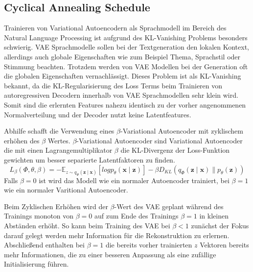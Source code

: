 \subsection{Cyclical Annealing Schedule}
\label{cyc_anneal}
Trainieren von Variational Autoencodern als Sprachmodell im Bereich des Natural Language Processing ist aufgrund des KL-Vanishing Problems besonders schwierig.
VAE Sprachmodelle sollen bei der Textgeneration den lokalen Kontext, allerdings auch globale Eigenschaften wie zum Beispiel Thema, Sprachstil oder Stimmung beachten. 
Trotzdem werden von VAE Modellen bei der Generation oft die globalen Eigenschaften vernachlässigt. 
Dieses Problem ist als KL-Vanishing bekannt, da die KL-Regularisierung des Loss Terms beim Trainieren von autoregressiven Decodern innerhalb von VAE Sprachmodellen sehr klein wird.
Somit sind die erlernten Features nahezu identisch zu der vorher angenommenen Normalverteilung und der Decoder nutzt keine Latentfeatures. %

Abhilfe schafft die Verwendung eines $\beta$-Variational Autoencoder mit zyklischem erhöhen des $\beta$ Wertes.
$\beta$-Variational Autoencoder sind Variational Autoencoder die mit einen Lagrangemultiplikator $\beta$ die KL-Divergenz der Loss-Funktion gewichten um besser separierte Latentfaktoren zu finden.
\begin{equation}
    L_{\beta}(\Phi,\theta,\beta) = -\mathbb{E}_{z\sim q_\Phi(\mathbf{z\mid x})}[log p_\theta (\mathbf{x\mid z})]- \beta D_{KL}(q_\Phi(\mathbf{z\mid x}) \parallel p_\theta(\mathbf{z})) 
\end{equation}
Falls $\beta = 0$ ist wird das Modell wie ein normaler Autoencoder trainiert, bei $\beta = 1$ wie ein normaler Varitional Autoencoder.

Beim Zyklischen Erhöhen wird der $\beta$-Wert des VAE geplant während des Trainings monoton von $\beta=0$ auf zum Ende des Trainings $\beta=1$ in kleinen Abständen erhöht.
So kann beim Training des VAE bei $\beta<1$ zunächst der Fokus darauf gelegt werden mehr Information für die Rekonstruktion zu erlernen. 
Abschließend enthalten bei $\beta=1$ die bereits vorher trainierten $z$ Vektoren bereits mehr Informationen, die zu einer besseren Anpassung als eine zufällige Initialisierung führen.





